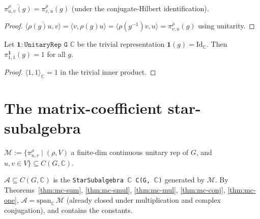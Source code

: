 \begin{theorem}
  \label{thm:mc-conj}
  $\overline{\pi_{u,v}^\rho(g)} = \pi_{v, u}^{\overline\rho}(g)$ (under
  the conjugate-Hilbert identification).
\end{theorem}

\begin{proof}
  $\overline{\langle\rho(g)u, v\rangle} = \langle v, \rho(g) u\rangle =
   \langle\rho(g^{-1}) v, u\rangle = \pi_{v, u}^{\overline\rho}(g)$
  using unitarity.
\end{proof}

\begin{theorem}
  \label{thm:mc-one}
  \leanok
  Let $\mathbf{1} : \texttt{UnitaryRep G $\mathbb C$}$ be the trivial
  representation $\mathbf{1}(g) = \mathrm{Id}_{\mathbb C}$. Then
  $\pi_{1, 1}^{\mathbf 1}(g) = 1$ for all $g$.
\end{theorem}

\begin{proof}
  $\langle 1, 1\rangle_{\mathbb C} = 1$ in the trivial inner product.
\end{proof}

\section{The matrix-coefficient star-subalgebra}

\begin{definition}
  \label{def:MCSet}
  \leanok
  $\mathcal M := \{\pi_{u,v}^\rho \mid (\rho, V)$ a finite-dim continuous
  unitary rep of $G$, and $u, v \in V\} \subseteq C(G, \mathbb C)$.
\end{definition}

\begin{definition}
  \label{def:MCAlg}
  \leanok
  $\mathcal A \subseteq C(G, \mathbb C)$ is the
  \texttt{StarSubalgebra $\mathbb C$ C(G, $\mathbb C$)} generated by
  $\mathcal M$. By
  Theorems~\ref{thm:mc-sum},
  \ref{thm:mc-smul},
  \ref{thm:mc-mul},
  \ref{thm:mc-conj},
  \ref{thm:mc-one},
  $\mathcal A = \mathrm{span}_{\mathbb C}\,\mathcal M$ (already closed under
  multiplication and complex conjugation), and contains the constants.
\end{definition}


